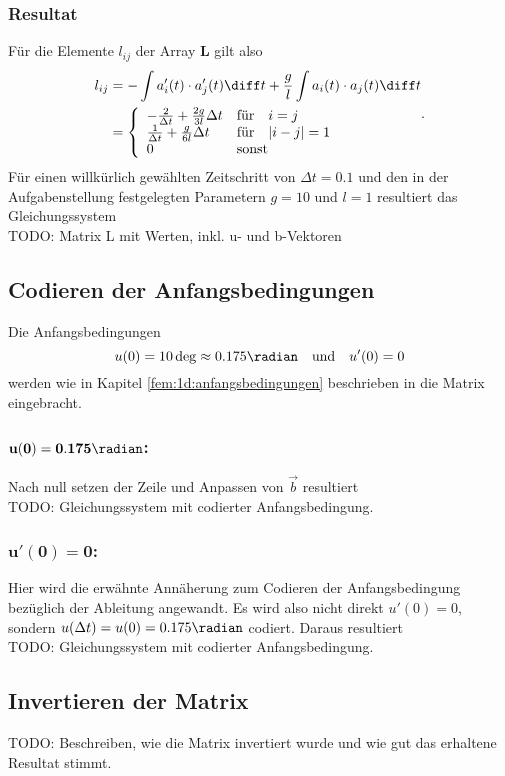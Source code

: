 \subsubsection{Resultat}
Für die Elemente $l_{ij}$ der Array $\mathbf{L}$ gilt also
\begin{equation}
    \begin{aligned}
        l_{ij} 
        &= - \int a_i'(t) \cdot a_j'(t) \diff t + \frac{g}{l} \int a_i(t) \cdot a_j(t) \diff t \\
        &=  \left\{ 
                \begin{array}{ll}
                    - \frac{2}{\Delta t} + \frac{2g}{3l} \Delta t & \text{für} \quad i = j \\
                    \frac{1}{\Delta t} + \frac{g}{6l} \Delta t & \text{für} \quad |i - j| = 1 \\
                    0 & \text{sonst}
                \end{array} 
            \right.
    \end{aligned}.
\end{equation}
Für einen willkürlich gewählten Zeitschritt von $\Delta t = 0.1$ und den in der Aufgabenstellung festgelegten Parametern $g = 10$ und $l = 1$ resultiert das Gleichungssystem
\begin{equation}
\end{equation}
TODO: Matrix L mit Werten, inkl. u- und b-Vektoren


\subsection{Codieren der Anfangsbedingungen}
Die Anfangsbedingungen
\begin{equation}
    u(0) = 10 \deg \approx 0.175 \radian
    \quad \text{und} \quad
    u'(0) = 0
\end{equation}
werden wie in Kapitel \ref{fem:1d:anfangsbedingungen} beschrieben in die Matrix eingebracht.

\subsubsection{$\mathbf{u(0) = 0.175 \radian}$:}
Nach null setzen der Zeile und Anpassen von $\vec{b}$ resultiert
\begin{equation}
\end{equation}
TODO: Gleichungssystem mit codierter Anfangsbedingung.

\subsubsection{$\mathbf{u'(0) = 0 }$:}
Hier wird die erwähnte Annäherung zum Codieren der Anfangsbedingung bezüglich der Ableitung angewandt.
Es wird also nicht direkt $u'(0) = 0 $, sondern $u(\Delta t) = u(0) = 0.175 \radian$ codiert.
Daraus resultiert
\begin{equation}
\end{equation}
TODO: Gleichungssystem mit codierter Anfangsbedingung.


\subsection{Invertieren der Matrix}
TODO: Beschreiben, wie die Matrix invertiert wurde und wie gut das erhaltene Resultat stimmt.